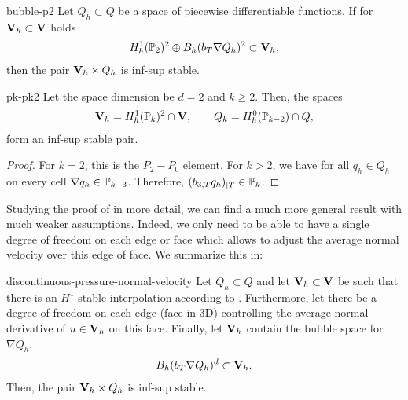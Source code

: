 \begin{Corollary}{bubble-p2}
  Let $Q_h\subset Q$ be a space of piecewise differentiable
  functions. If for $\vV_h\subset \vV$ holds
  \begin{gather}
    H^1_h(\P_2)^2 \oplus B_h(b_\cell \nabla Q_h)^2 \subset \vV_h,
  \end{gather}
  then the pair $\vV_h\times Q_h$ is inf-sup stable.
\end{Corollary}

\begin{Corollary}{pk-pk2}
  Let the space dimension be $d=2$ and $k\ge 2$. Then, the spaces
  \begin{gather}
    \vV_h = H^1_h(\P_k)^2 \cap \vV,
    \qquad
    Q_k = H^0_h(\P_{k-2}) \cap Q,
  \end{gather}
  form an inf-sup stable pair.
\end{Corollary}

\begin{proof}
  For $k=2$, this is the $P_2-P_0$ element. For $k>2$, we have for all
  $q_h\in Q_h$ on every cell $\nabla q_h\in \P_{k-3}$. Therefore,
  $(b_{3,\cell} q_h)_{|\cell} \in \P_k$.
\end{proof}

\begin{intro}
  Studying the proof of  in more
  detail, we can find a much more general result with much weaker
  assumptions. Indeed, we only need to be able to have a single degree
  of freedom on each edge or face which allows to adjust the average
  normal velocity over this edge of face. We summarize this in:
\end{intro}

\begin{Theorem}{discontinuous-pressure-normal-velocity}
  Let $Q_h\subset Q$ and let $\vV_h \subset \vV$ be such that there is an
  $H^1$-stable interpolation according to
  . Furthermore, let
  there be a degree of freedom on each edge (face in 3D) controlling
  the average normal derivative of $u\in \vV_h$ on this face. Finally,
  let $\vV_h$ contain the bubble space for $\nabla Q_h$,
  \begin{gather}
    B_h(b_\cell \nabla Q_h)^d \subset \vV_h.
  \end{gather}
  Then, the pair $\vV_h\times Q_h$ is inf-sup stable.
\end{Theorem}

